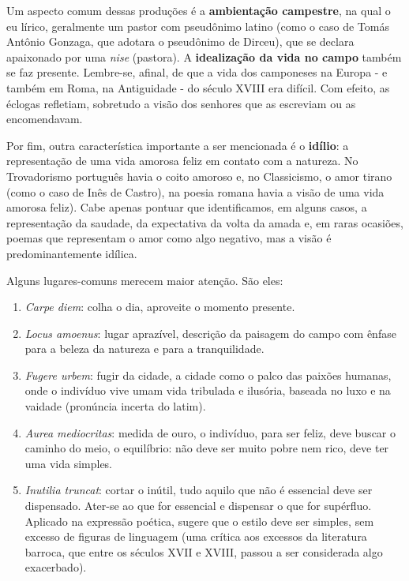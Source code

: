 Um aspecto comum dessas produções é a \textbf{ambientação campestre}, na qual o eu lírico, geralmente um pastor com pseudônimo latino (como o caso de Tomás Antônio Gonzaga, que adotara o pseudônimo de Dirceu), que se declara apaixonado por uma \textit{nise} (pastora). A \textbf{idealização da vida no campo} também se faz presente. Lembre-se, afinal, de que a vida dos camponeses na Europa - e também em Roma, na Antiguidade - do século XVIII era difícil. Com efeito, as éclogas refletiam, sobretudo a visão dos senhores que as escreviam ou as encomendavam.

Por fim, outra característica importante a ser mencionada é o \textbf{idílio}: a representação de uma vida amorosa feliz em contato com a natureza. No Trovadorismo português havia o coito amoroso e, no Classicismo, o amor tirano (como o caso de Inês de Castro), na poesia romana havia a visão de uma vida amorosa feliz). Cabe apenas pontuar que identificamos, em alguns casos, a representação da saudade, da expectativa da volta da amada e, em raras ocasiões, poemas que representam o amor como algo negativo, mas a visão é predominantemente idílica.

Alguns lugares-comuns merecem maior atenção. São eles:

\begin{enumerate}
\item \textit{Carpe diem}: colha o dia, aproveite o momento presente.
\item \textit{Locus amoenus}: lugar aprazível, descrição da paisagem do campo com ênfase para a beleza da natureza e para a tranquilidade.
\item \textit{Fugere urbem}: fugir da cidade, a cidade como o palco das paixões humanas, onde o indivíduo vive umam vida tribulada e ilusória, baseada no luxo e na vaidade (pronúncia incerta do latim).
\item \textit{Aurea mediocritas}: medida de ouro, o indivíduo, para ser feliz, deve buscar o caminho do meio, o equilíbrio: não deve ser muito pobre nem rico, deve ter uma vida simples.
\item \textit{Inutilia truncat}: cortar o inútil, tudo aquilo que não é essencial deve ser dispensado. Ater-se ao que for essencial e dispensar o que for supérfluo. Aplicado na expressão poética, sugere que o estilo deve ser simples, sem excesso de figuras de linguagem (uma crítica aos excessos da literatura barroca, que entre os séculos XVII e XVIII, passou a ser considerada algo exacerbado).
\end{enumerate}
  
